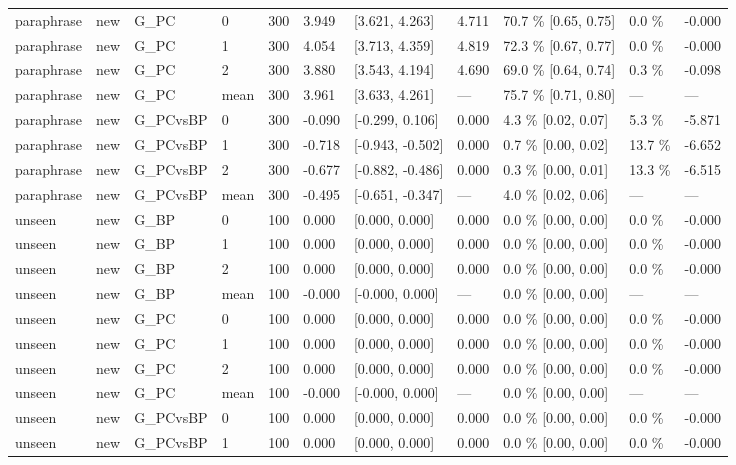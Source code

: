 \documentclass[10pt,a4paper]{article}
\begin{document}
\begin{center}
\begin{tabularx}{\textwidth}{@{}p{}XXXXXXXXXX@{}}
paraphrase & new & G\_PC & 0 & 300 & 3.949 & [3.621, 4.263] & 4.711 & 70.7 \% [0.65, 0.75] & 0.0 \% & -0.000 \\
paraphrase & new & G\_PC & 1 & 300 & 4.054 & [3.713, 4.359] & 4.819 & 72.3 \% [0.67, 0.77] & 0.0 \% & -0.000 \\
paraphrase & new & G\_PC & 2 & 300 & 3.880 & [3.543, 4.194] & 4.690 & 69.0 \% [0.64, 0.74] & 0.3 \% & -0.098 \\
paraphrase & new & G\_PC & mean & 300 & 3.961 & [3.633, 4.261] & — & 75.7 \% [0.71, 0.80] & — & — \\
paraphrase & new & G\_PCvsBP & 0 & 300 & -0.090 & [-0.299, 0.106] & 0.000 & 4.3 \% [0.02, 0.07] & 5.3 \% & -5.871 \\
paraphrase & new & G\_PCvsBP & 1 & 300 & -0.718 & [-0.943, -0.502] & 0.000 & 0.7 \% [0.00, 0.02] & 13.7 \% & -6.652 \\
paraphrase & new & G\_PCvsBP & 2 & 300 & -0.677 & [-0.882, -0.486] & 0.000 & 0.3 \% [0.00, 0.01] & 13.3 \% & -6.515 \\
paraphrase & new & G\_PCvsBP & mean & 300 & -0.495 & [-0.651, -0.347] & — & 4.0 \% [0.02, 0.06] & — & — \\
unseen & new & G\_BP & 0 & 100 & 0.000 & [0.000, 0.000] & 0.000 & 0.0 \% [0.00, 0.00] & 0.0 \% & -0.000 \\
unseen & new & G\_BP & 1 & 100 & 0.000 & [0.000, 0.000] & 0.000 & 0.0 \% [0.00, 0.00] & 0.0 \% & -0.000 \\
unseen & new & G\_BP & 2 & 100 & 0.000 & [0.000, 0.000] & 0.000 & 0.0 \% [0.00, 0.00] & 0.0 \% & -0.000 \\
unseen & new & G\_BP & mean & 100 & -0.000 & [-0.000, 0.000] & — & 0.0 \% [0.00, 0.00] & — & — \\
unseen & new & G\_PC & 0 & 100 & 0.000 & [0.000, 0.000] & 0.000 & 0.0 \% [0.00, 0.00] & 0.0 \% & -0.000 \\
unseen & new & G\_PC & 1 & 100 & 0.000 & [0.000, 0.000] & 0.000 & 0.0 \% [0.00, 0.00] & 0.0 \% & -0.000 \\
unseen & new & G\_PC & 2 & 100 & 0.000 & [0.000, 0.000] & 0.000 & 0.0 \% [0.00, 0.00] & 0.0 \% & -0.000 \\
unseen & new & G\_PC & mean & 100 & -0.000 & [-0.000, 0.000] & — & 0.0 \% [0.00, 0.00] & — & — \\
unseen & new & G\_PCvsBP & 0 & 100 & 0.000 & [0.000, 0.000] & 0.000 & 0.0 \% [0.00, 0.00] & 0.0 \% & -0.000 \\
unseen & new & G\_PCvsBP & 1 & 100 & 0.000 & [0.000, 0.000] & 0.000 & 0.0 \% [0.00, 0.00] & 0.0 \% & -0.000 \\

\end{tabularx}
\end{center}
\end{document}
